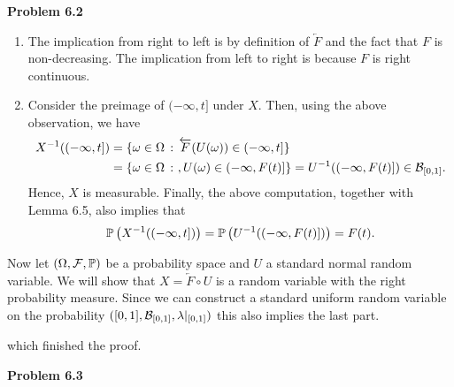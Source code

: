 
\textbf{Problem 6.2}
\begin{enumerate}[label=(\alph*)]
\item The implication from right to left is by definition of $\overleftarrow{F}$ and the fact that $F$ is non-decreasing. The implication from left to right is because $F$ is right continuous.
\item Consider the preimage of $(-\infty, t]$ under $X$. Then, using the above observation, we have
\begin{align*}
	X^{-1}((-\infty,t]) &= \{\omega \in \Omega \, : \, \overleftarrow{F}(U(\omega)) \in (-\infty,t]\}\\
	&= \{\omega \in \Omega \, :\ , U(\omega) \in (-\infty, F(t)]\} = U^{-1}((-\infty, F(t)]) \in \mathcal B_{[0,1]}.
\end{align*}
Hence, $X$ is measurable. Finally, the above computation, together with Lemma 6.5, also implies that
\[
	\mathbb P\left(X^{-1}((-\infty,t])\right) = \mathbb P\left(U^{-1}((-\infty, F(t)])\right) = F(t).
\]
\end{enumerate}


Now let $(\Omega,\mathcal F, \mathbb P)$ be a probability space and $U$ a standard normal random variable. We will show that $X = \overleftarrow{F} \circ U$ is a random variable with the right probability measure. Since we can construct a standard uniform random variable on the probability $([0,1], \mathcal B_{[0,1]}, \lambda|_{[0,1]})$ this also implies the last part. 


which finished the proof.

\bigskip

\textbf{Problem 6.3}

